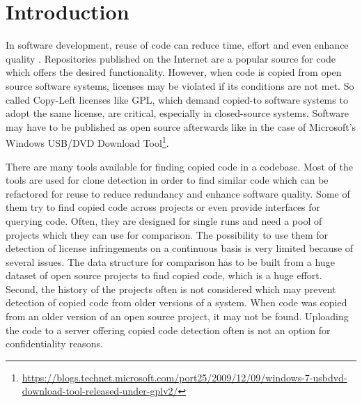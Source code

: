 
\chapter{Introduction}\label{chapter:introduction}
In software development, reuse of code can reduce time, effort and even enhance quality \cite{krueger1992software}.
Repositories published on the Internet are a popular source for code which offers the desired functionality.
However, when code is copied from open source software systems, licenses may be violated if its conditions are not met.
So called Copy-Left licenses like GPL, which demand copied-to software systems to adopt the same license, are critical, especially in closed-source systems.
Software may have to be published as open source afterwards like in the case of Microsoft's \glqq Windows USB/DVD Download Tool\grqq\footnote{\href{https://blogs.technet.microsoft.com/port25/2009/12/09/windows-7-usbdvd-download-tool-released-under-gplv2/}{https://blogs.technet.microsoft.com/port25/2009/12/09/windows-7-usbdvd-download-tool-released-under-gplv2/}}.

There are many tools available for finding copied code in a codebase.
Most of the tools are used for clone detection in order to find similar code which can be refactored for reuse to reduce redundancy and enhance software quality.
Some of them try to find copied code across projects or even provide interfaces for querying code.
Often, they are designed for single runs and need a pool of projects which they can use for comparison.
The possibility to use them for detection of license infringements on a continuous basis is very limited because of several issues.
The data structure for comparison has to be built from a huge dataset of open source projects to find copied code, which is a huge effort.
Second, the history of the projects often is not considered which may prevent detection of copied code from older versions of a system.
When code was copied from an older version of an open source project, it may not be found.
Uploading the code to a server offering copied code detection often is not an option for confidentiality reasons.

